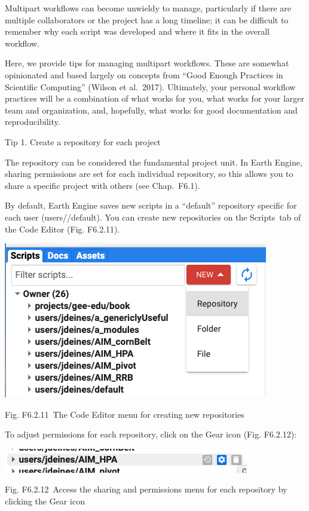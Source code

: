 \documentclass[
  letterpaper,
  DIV=11,
  numbers=noendperiod]{scrreprt}
\begin{document}
Multipart workflows can become unwieldy to manage, particularly if there
are multiple collaborators or the project has a long timeline; it can be
difficult to remember why each script was developed and where it fits in
the overall workflow.

Here, we provide tips for managing multipart workflows. These are
somewhat opinionated and based largely on concepts from ``Good Enough
Practices in Scientific Computing'' (Wilson et al.~2017). Ultimately,
your personal workflow practices will be a combination of what works for
you, what works for your larger team and organization, and, hopefully,
what works for good documentation and reproducibility.

Tip 1. Create a repository for each project

The repository can be considered the fundamental project unit. In Earth
Engine, sharing permissions are set for each individual repository, so
this allows you to share a specific project with others (see
Chap.~F6.1).

By default, Earth Engine saves new scripts in a ``default'' repository
specific for each user (users//default). You can create new repositories
on the Scripts~tab of the Code Editor (Fig. F6.2.11).

\includegraphics{./F6/image20.png}

Fig. F6.2.11~The Code Editor menu for creating new repositories

To adjust permissions for each repository, click on the Gear icon (Fig.
F6.2.12):

\includegraphics{./F6/image67.png}

Fig. F6.2.12~Access the sharing and permissions menu for each repository
by clicking the Gear icon
\end{document}
